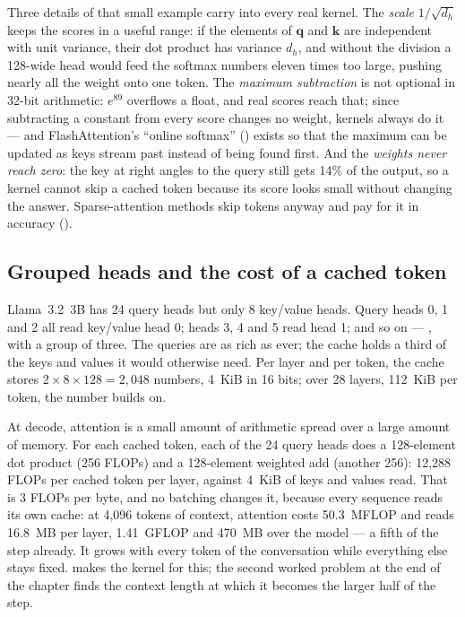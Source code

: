 
Three details of that small example carry into every real kernel. The
\emph{scale} $1/\sqrt{d_h}$ keeps the scores in a useful range: if the elements
of $\mathbf{q}$ and $\mathbf{k}$ are independent with unit variance, their dot
product has variance $d_h$, and without the division a 128-wide head would feed
the softmax numbers eleven times too large, pushing nearly all the weight onto
one token. The \emph{maximum subtraction} is not optional in 32-bit
arithmetic: $e^{89}$ overflows a float, and real scores reach that; since
subtracting a constant from every score changes no weight, kernels always do
it --- and FlashAttention's ``online softmax'' () exists
so that the maximum can be updated as keys stream past instead of being found
first. And the \emph{weights never reach zero}: the key at right angles to the
query still gets 14\% of the output, so a kernel cannot skip a cached token
because its score looks small without changing the answer. Sparse-attention
methods skip tokens anyway and pay for it in accuracy
().

\subsection{Grouped heads and the cost of a cached token}

Llama~3.2~3B has 24 query heads but only 8 key/value heads. Query heads 0, 1
and 2 all read key/value head 0; heads 3, 4 and 5 read head 1; and so on ---
 \cite{ainslie2023gqa}, with a group of three.
The queries are as rich as ever; the cache holds a third of the keys and values
it would otherwise need. Per layer and per token, the cache stores
$2 \times 8 \times 128 = 2{,}048$ numbers, 4~KiB in 16 bits; over 28 layers,
112~KiB per token, the number  builds on.

At decode, attention is a small amount of arithmetic spread over a large amount
of memory. For each cached token, each of the 24 query heads does a 128-element
dot product (256 FLOPs) and a 128-element weighted add (another 256): 12,288
FLOPs per cached token per layer, against 4~KiB of keys and values read. That
is 3 FLOPs per byte, and no batching changes it, because every sequence reads
its own cache: at 4,096 tokens of context, attention costs 50.3~MFLOP and reads
16.8~MB per layer, 1.41~GFLOP and 470~MB over the model --- a fifth of the step
already. It grows with every token of the conversation while everything else
stays fixed.  makes the kernel for this; the second
worked problem at the end of the chapter finds the context length at which it
becomes the larger half of the step.

